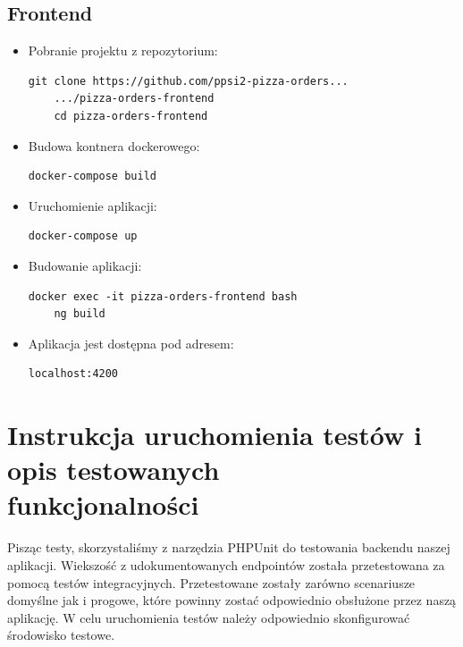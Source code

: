 \documentclass[12pt]{article}
\begin{document}
\clearpage

\subsection{Frontend}

\begin{itemize}
	\item Pobranie projektu z repozytorium:
	\begin{lstlisting}[]
	git clone https://github.com/ppsi2-pizza-orders...
	.../pizza-orders-frontend
	cd pizza-orders-frontend
	\end{lstlisting}
	\item Budowa kontnera dockerowego:
	\begin{lstlisting}[]
	docker-compose build
	\end{lstlisting}
	\item Uruchomienie aplikacji:
	\begin{lstlisting}[]
	docker-compose up
	\end{lstlisting}
	\item Budowanie aplikacji:
	\begin{lstlisting}[]
	docker exec -it pizza-orders-frontend bash
	ng build
	\end{lstlisting}
	\item Aplikacja jest dostępna pod adresem:
	\begin{lstlisting}[]
	localhost:4200
	\end{lstlisting}
\end{itemize}
\vspace{1cm}
\clearpage
\section{Instrukcja uruchomienia testów i opis testowanych \\ funkcjonalności}
\vspace{1cm}

Pisząc testy, skorzystaliśmy z narzędzia PHPUnit do testowania backendu naszej aplikacji.
Wiekszość z udokumentowanych endpointów została przetestowana za pomocą testów integracyjnych. Przetestowane zostały zarówno scenariusze domyślne jak i progowe, które powinny zostać odpowiednio obsłużone przez naszą aplikację.
W celu uruchomienia testów należy odpowiednio skonfigurować środowisko testowe.
\end{document}
